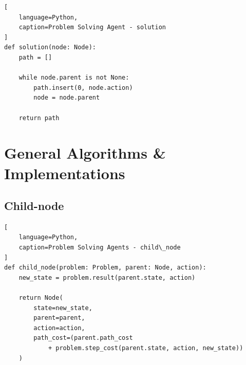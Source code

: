 \begin{lstlisting}[
    language=Python,
    caption=Problem Solving Agent - solution
]
def solution(node: Node):
    path = []

    while node.parent is not None:
        path.insert(0, node.action)
        node = node.parent
    
    return path
\end{lstlisting}






\section{General Algorithms \& Implementations}

\subsection{Child-node}

\vspace{0.2cm}

\begin{algorithm}[H]
    \caption{The function \textsc{Child-Node} takes a parent node and an action and returns the resulting child node \cite{ai/book/Artificial-Intelligence-A-Modern-Approach/Russell-Norvig}}

\end{algorithm}


\begin{lstlisting}[
    language=Python,
    caption=Problem Solving Agents - child\_node
]
def child_node(problem: Problem, parent: Node, action):
    new_state = problem.result(parent.state, action)

    return Node(
        state=new_state,
        parent=parent,
        action=action,
        path_cost=(parent.path_cost
            + problem.step_cost(parent.state, action, new_state))
    )
\end{lstlisting}



